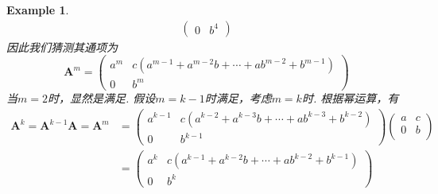 \documentclass{article}
\newtheorem{example}[theorem]{Example}
\newcommand{\mbf}[1]{\bm{#1}}
\begin{document}
\begin{example}
$$\begin{array}{ll}
\begin{pmatrix}
0 & b^4  
\end{pmatrix}
\end{array} 
$$
因此我们猜测其通项为
$$
\mbf{A}^m = \begin{pmatrix}
a^m & c(a^{m-1} + a^{m-2}b + \cdots + ab^{m-2}+b^{m-1}) \\
0 & b^m
\end{pmatrix}
$$
当$m = 2$时，显然是满足. 假设$m = k-1$时满足，考虑$m = k$时. 根据幂运算，有
$$
\begin{array}{ll}
\mbf{A}^k = \mbf{A}^{k-1} \mbf{A} = \mbf{A}^m &= \begin{pmatrix}
a^{k-1} & c(a^{k-2} + a^{k-3}b + \cdots + ab^{k-3}+b^{k-2}) \\
0 & b^{k-1}
\end{pmatrix}\begin{pmatrix}
a & c \\
0 & b\\
\end{pmatrix} \\
&= \begin{pmatrix}
a^{k} & c(a^{k-1} + a^{k-2}b + \cdots + ab^{k-2}+b^{k-1}) \\
0 & b^{k}
\end{pmatrix}
\end{array}
$$
\end{example}
\end{document}
